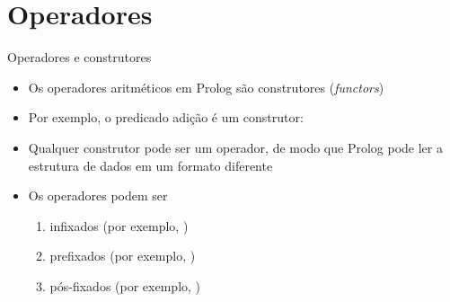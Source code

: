 \section{Operadores}

\begin{frame}[fragile]{Operadores e construtores}

    \begin{itemize}
        \item Os operadores aritméticos em Prolog são construtores (\textit{functors})

        \item Por exemplo, o predicado adição  é um construtor:


        \item Qualquer construtor pode ser um operador, de modo que Prolog pode ler a 
           estrutura de dados em um formato diferente

        \item Os operadores podem ser
        \begin{enumerate}
            \item infixados (por exemplo, )
            \item prefixados (por exemplo, )
            \item pós-fixados (por exemplo, )
        \end{enumerate}

    \end{itemize}

\end{frame}

